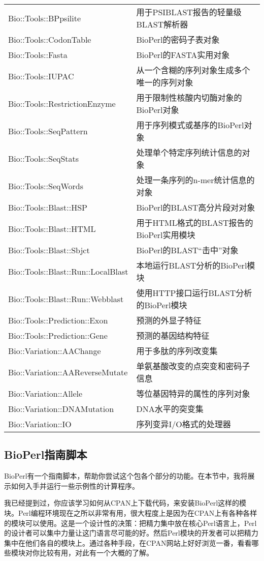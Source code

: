 \begin{table}[!htbp]
\begin{center}
\begin{tabu}{X[1.5,l,m]X[3,l,m]}
  Bio::Tools::BPpsilite & 用于PSIBLAST报告的轻量级BLAST解析器\\
  Bio::Tools::CodonTable & BioPerl的密码子表对象\\
  Bio::Tools::Fasta & BioPerl的FASTA实用对象\\
  Bio::Tools::IUPAC & 从一个含糊的序列对象生成多个唯一的序列对象\\
  Bio::Tools::RestrictionEnzyme & 用于限制性核酸内切酶对象的BioPerl对象\\
  Bio::Tools::SeqPattern & 用于序列模式或基序的BioPerl对象\\
  Bio::Tools::SeqStats & 处理单个特定序列统计信息的对象\\
  Bio::Tools::SeqWords & 处理一条序列的n-mer统计信息的对象\\
  Bio::Tools::Blast::HSP & BioPerl的BLAST高分片段对对象\\
  Bio::Tools::Blast::HTML & 用于HTML格式的BLAST报告的BioPerl实用模块\\
  Bio::Tools::Blast::Sbjct & BioPerl的BLAST“击中”对象\\
  Bio::Tools::Blast::Run::LocalBlast & 本地运行BLAST分析的BioPerl模块\\
  Bio::Tools::Blast::Run::Webblast & 使用HTTP接口运行BLAST分析的BioPerl模块\\
  Bio::Tools::Prediction::Exon & 预测的外显子特征\\
  Bio::Tools::Prediction::Gene & 预测的基因结构特征\\
  Bio::Variation::AAChange & 用于多肽的序列改变集\\
  Bio::Variation::AAReverseMutate & 单氨基酸改变的点突变和密码子信息\\
  Bio::Variation::Allele & 等位基因特异的属性的序列对象\\
  Bio::Variation::DNAMutation & DNA水平的突变集\\
  Bio::Variation::IO & 序列变异I/O格式的处理器\\
  \bottomrule
  \end{tabu}
  \end{center}
\end{table}

\subsection{BioPerl指南脚本}
BioPerl有一个指南脚本，帮助你尝试这个包各个部分的功能。在本节中，我将展示如何入手并运行一些示例性的计算程序。

我已经提到过，你应该学习如何从CPAN上下载代码，来安装BioPerl这样的模块。Perl编程环境现在之所以非常有用，很大程度上是因为在CPAN上有各种各样的模块可以使用。这是一个设计性的决策：把精力集中放在核心Perl语言上，Perl的设计者可以集中力量让这门语言尽可能的好。然后Perl模块的开发者可以把精力集中在他们各自的模块上。通过各种手段，在CPAN网站上好好浏览一番，看看哪些模块对你比较有用，对此有一个大概的了解。

